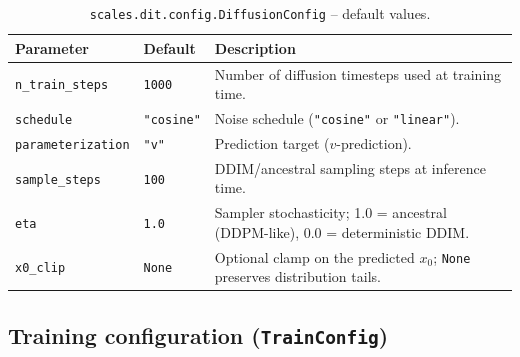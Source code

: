 \documentclass[11pt]{article}
\begin{document}
\begin{table}[h]
\centering
\caption{\texttt{scales.dit.config.DiffusionConfig} -- default values.}
\begin{tabular}{@{}llL{7cm}@{}}
\toprule
Parameter & Default & Description \\
\midrule
\texttt{n\_train\_steps}   & \texttt{1000}    & Number of diffusion timesteps used at training time. \\
\texttt{schedule}          & \texttt{"cosine"} & Noise schedule (\texttt{"cosine"} or \texttt{"linear"}). \\
\texttt{parameterization}  & \texttt{"v"}      & Prediction target ($v$-prediction). \\
\texttt{sample\_steps}     & \texttt{100}      & DDIM/ancestral sampling steps at inference time. \\
\texttt{eta}               & \texttt{1.0}      & Sampler stochasticity; 1.0 = ancestral (DDPM-like), 0.0 = deterministic DDIM. \\
\texttt{x0\_clip}          & \texttt{None}     & Optional clamp on the predicted $x_0$; \texttt{None} preserves distribution tails. \\
\bottomrule
\end{tabular}
\end{table}

\subsection{Training configuration (\texttt{TrainConfig})}
\end{document}
